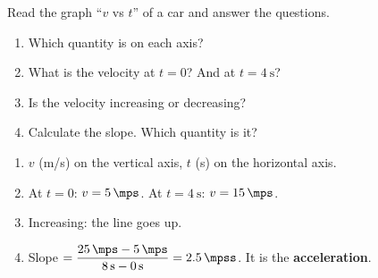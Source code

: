 \begin{exercise}
    Read the graph ``\(v\) vs \(t\)'' of a car and answer the questions.
    \begin{center}
    \end{center}
    \begin{enumerate}[label=\letraminuscula]
        \item Which quantity is on each axis?
        \item What is the velocity at \(t = 0\)? And at \(t = \qty{4}{\s}\)?
        \item Is the velocity increasing or decreasing?
        \item Calculate the slope. Which quantity is it?
    \end{enumerate}
    \begin{solu}
        \begin{enumerate}[label=\alph*)]
            \item \(v\) (m/s) on the vertical axis, \(t\) (s) on the horizontal axis.
            \item At \(t = 0\): \(v = \qty{5}{\mps}\). At \(t = \qty{4}{\s}\): \(v = \qty{15}{\mps}\).
            \item Increasing: the line goes up.
            \item Slope \(= \dfrac{\qty{25}{\mps} - \qty{5}{\mps}}{\qty{8}{\s} - \qty{0}{\s}} = \qty{2.5}{\mpss}\). It is the \textbf{acceleration}.
        \end{enumerate}
    \end{solu}
\end{exercise}

